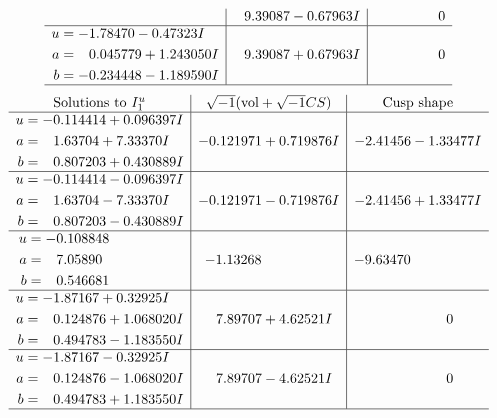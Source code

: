 \documentclass[1p]{elsarticle_modified}
\theoremstyle{definition}
\newcommand{\I}{\sqrt{-1}}
\begin{document}
$$\begin{array}{c|c|c}
 & \phantom{-}9.39087 - 0.67963 I & \phantom{-0.000000 } 0 \\ \hline\begin{aligned}
u &= -1.78470 - 0.47323 I \\
a &= \phantom{-}0.045779 + 1.243050 I \\
b &= -0.234448 - 1.189590 I\end{aligned}
 & \phantom{-}9.39087 + 0.67963 I & \phantom{-0.000000 } 0\\
 \hline 
 \end{array}$$\newpage$$\begin{array}{c|c|c}  
\text{Solutions to }I^u_{1}& \I (\text{vol} + \sqrt{-1}CS) & \text{Cusp shape}\\
 \hline 
\begin{aligned}
u &= -0.114414 + 0.096397 I \\
a &= \phantom{-}1.63704 + 7.33370 I \\
b &= \phantom{-}0.807203 + 0.430889 I\end{aligned}
 & -0.121971 + 0.719876 I & -2.41456 - 1.33477 I \\ \hline\begin{aligned}
u &= -0.114414 - 0.096397 I \\
a &= \phantom{-}1.63704 - 7.33370 I \\
b &= \phantom{-}0.807203 - 0.430889 I\end{aligned}
 & -0.121971 - 0.719876 I & -2.41456 + 1.33477 I \\ \hline\begin{aligned}
u &= -0.108848\phantom{ +0.000000I} \\
a &= \phantom{-}7.05890\phantom{ +0.000000I} \\
b &= \phantom{-}0.546681\phantom{ +0.000000I}\end{aligned}
 & -1.13268\phantom{ +0.000000I} & -9.63470\phantom{ +0.000000I} \\ \hline\begin{aligned}
u &= -1.87167 + 0.32925 I \\
a &= \phantom{-}0.124876 + 1.068020 I \\
b &= \phantom{-}0.494783 - 1.183550 I\end{aligned}
 & \phantom{-}7.89707 + 4.62521 I & \phantom{-0.000000 } 0 \\ \hline\begin{aligned}
u &= -1.87167 - 0.32925 I \\
a &= \phantom{-}0.124876 - 1.068020 I \\
b &= \phantom{-}0.494783 + 1.183550 I\end{aligned}
 & \phantom{-}7.89707 - 4.62521 I & \phantom{-0.000000 } 0\\
 \hline 
 \end{array}$$\newpage\newpage\renewcommand{\arraystretch}{1}
\end{document}
